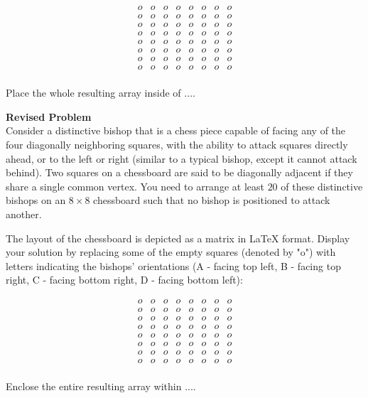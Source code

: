 $$\begin{array}{cccccccc}
o & o & o & o & o & o & o & o \\
o & o & o & o & o & o & o & o \\
o & o & o & o & o & o & o & o \\
o & o & o & o & o & o & o & o \\
o & o & o & o & o & o & o & o \\
o & o & o & o & o & o & o & o \\
o & o & o & o & o & o & o & o \\
o & o & o & o & o & o & o & o \\
\end{array}$$

Place the whole resulting array inside of $\boxed{...}$.


\textbf{Revised Problem}\\
Consider a distinctive bishop that is a chess piece capable of facing any of the four diagonally neighboring squares, with the ability to attack squares directly ahead, or to the left or right (similar to a typical bishop, except it cannot attack behind). Two squares on a chessboard are said to be diagonally adjacent if they share a single common vertex. You need to arrange at least $20$ of these distinctive bishops on an $8 \times 8$ chessboard such that no bishop is positioned to attack another.

The layout of the chessboard is depicted as a matrix in LaTeX format. Display your solution by replacing some of the empty squares (denoted by "o") with letters indicating the bishops' orientations (A - facing top left, B - facing top right, C - facing bottom right, D - facing bottom left):

$$\begin{array}{cccccccc}
o & o & o & o & o & o & o & o \\
o & o & o & o & o & o & o & o \\
o & o & o & o & o & o & o & o \\
o & o & o & o & o & o & o & o \\
o & o & o & o & o & o & o & o \\
o & o & o & o & o & o & o & o \\
o & o & o & o & o & o & o & o \\
o & o & o & o & o & o & o & o \\
\end{array}$$

Enclose the entire resulting array within $\boxed{...}$.

